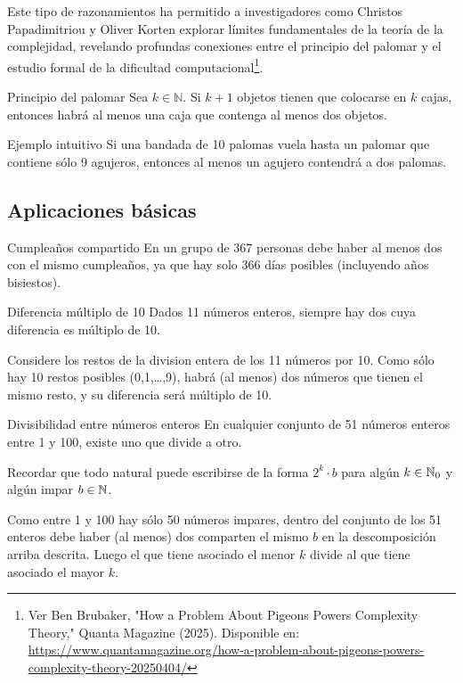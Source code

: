 Este tipo de razonamientos ha permitido a investigadores como Christos Papadimitriou y Oliver Korten explorar límites fundamentales de la teoría de la complejidad, revelando profundas conexiones entre el principio del palomar y el estudio formal de la dificultad computacional\footnote{Ver Ben Brubaker, "How a Problem About Pigeons Powers Complexity Theory," Quanta Magazine (2025). Disponible en: \url{https://www.quantamagazine.org/how-a-problem-about-pigeons-powers-complexity-theory-20250404/}}.



\begin{definitionblock}{Principio del palomar}
Sea $k \in \mathbb{N}$. Si $k+1$ objetos tienen que colocarse en $k$ cajas, entonces habrá al menos una caja que contenga al menos dos objetos.
\end{definitionblock}

\begin{exampleblock}{Ejemplo intuitivo}
Si una bandada de 10 palomas vuela hasta un palomar que contiene sólo 9 agujeros, entonces al menos un agujero contendrá a dos palomas.
\end{exampleblock}

\subsection*{Aplicaciones básicas}

\begin{exampleblock}{Cumpleaños compartido}
En un grupo de 367 personas debe haber al menos dos con el mismo cumpleaños, ya que hay solo 366 días posibles (incluyendo años bisiestos).
\end{exampleblock}

\begin{exampleblock}{Diferencia múltiplo de 10}
Dados 11 números enteros, siempre hay dos cuya diferencia es múltiplo de 10.
\medskip

Considere los restos de la division entera de los 11 números por 10.  Como sólo hay 10 restos posibles (0,1,\ldots,9), habrá (al menos) dos
números que tienen el mismo resto, y su diferencia será múltiplo de 10.
\end{exampleblock}

\begin{exampleblock}{Divisibilidad entre números enteros}
En cualquier conjunto de 51 números enteros entre 1 y 100, existe uno que divide a otro. 
\medskip

Recordar que todo natural puede escribirse de la forma $2^k \cdot b$ para algún
 $k \in \mathbb{N}_0$ y algún impar $b \in \mathbb{N}$. 

Como entre 1 y 100 hay sólo 50 números impares, dentro del conjunto de los 51
enteros debe haber (al menos) dos comparten el mismo $b$ en la descomposición
arriba descrita. Luego el que tiene asociado el menor $k$ divide al que tiene asociado el
mayor $k$.
\end{exampleblock}


